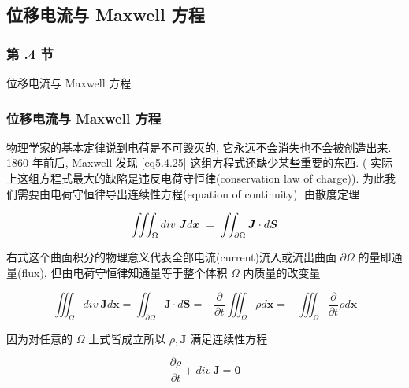 \documentclass[aspectratio=2516]{beamer}
\begin{document}
\subsection{\kaishu 位移电流与 Maxwell 方程}


\begin{frame}
\frametitle{ 第 \kaishu \uppercase\expandafter{}.4 节 }
\begin{center}
	\Large \kaishu  位移电流与 Maxwell 方程
\end{center}

\end{frame}


\begin{frame}
\frametitle{\kaishu 位移电流与 Maxwell 方程}

\kaishu

\small

物理学家的基本定律说到电荷是不可毁灭的, 它永远不会消失也不会被创造出来. 1860 年前后, Maxwell 发现 \ref{eq5.4.25} 这组方程式还缺少某些重要的东西. ({\color{blue} 实际上这组方程式最大的缺陷是违反电荷守恒律(conservation law of charge)}). 为此我们需要由电荷守恒律导出连续性方程(equation of continuity). 由散度定理

\begin{equation}
\iiint_\Omega  {div\;\boldsymbol{J}d\boldsymbol{x}\; = \;\iint_{\partial \Omega } {\boldsymbol{J} \cdot d\boldsymbol{S}}}
\notag 
\end{equation}

右式这个曲面积分的物理意义代表全部电流(current)流入或流出曲面 $ {\partial \Omega } $ 的量即通量(flux), 但由电荷守恒律知通量等于整个体积 $ \Omega $ 内质量的改变量

\begin{equation}
\iiint_\Omega  {div \ \boldsymbol{J}d\boldsymbol{x} = \iint_{\partial \Omega } {\boldsymbol{J} \cdot d\boldsymbol{S}}} =  - \frac{\partial }{{\partial t}}\iiint_\Omega  {\rho d\boldsymbol{x}} =  - \iiint_\Omega  {\frac{\partial }{{\partial t}}\rho d\boldsymbol{x}}
\label{eq5.4.26}
\end{equation}

因为对任意的 $ \Omega $ 上式皆成立所以 $ \rho, \boldsymbol{J} $ 满足连续性方程

\begin{equation}
\frac{{\partial \rho }}{{\partial t}} + div \ \boldsymbol{J} = \boldsymbol{0}
\label{eq5.4.27}
\end{equation}

\end{frame}
\end{document}
